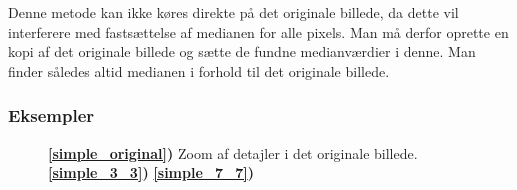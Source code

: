 {Denne metode kan ikke køres direkte på det originale billede, da dette
vil interferere med fastsættelse af medianen for alle pixels. Man må
derfor oprette en kopi af det originale billede og sætte de fundne
medianværdier i denne. Man finder således altid medianen i forhold til det
originale billede.

\subsubsection*{Eksempler}

\begin{figure}[!h]
    \centering
    \hspace{1em}
    \hspace{1em}
    \caption[]{
        \textbf{\ref{simple_original})} Zoom af detajler i det originale billede.
        \textbf{\ref{simple_3_3})}
        \textbf{\ref{simple_7_7})}
    }
    \label{simple_metode}
\end{figure}

}

